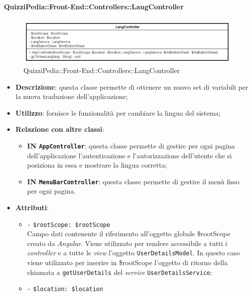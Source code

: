 \paragraph{QuizziPedia::Front-End::Controllers::LangController}
\begin{figure} [ht]
	\centering
	\includegraphics[scale=0.5]{UML/Classi/Front-End/QuizziPedia_Front-end_Controller_LangController.png}
	\caption{QuizziPedia::Front-End::Controllers::LangController}
\end{figure} \FloatBarrier
\begin{itemize}
	\item \textbf{Descrizione}: questa classe permette di ottenere un nuovo set di variabili per la nuova traduzione dell'applicazione;
	\item \textbf{Utilizzo}: fornisce le funzionalità per cambiare la lingua del sistema;
	\item \textbf{Relazione con altre classi}:
	\begin{itemize}
		\item \textbf{IN \texttt{AppController}}: questa classe permette di gestire per ogni pagina dell'applicazione l'autenticazione e l'autorizzazione dell'utente che si posiziona in essa e mostrare la lingua corretta;
		\item \textbf{IN \texttt{MenuBarController}}: questa classe permette di gestire il menù fisso per ogni pagina.
	\end{itemize}
	\item \textbf{Attributi}:
	\begin{itemize}
		\item \texttt{-} \texttt{\$rootScope: \$rootScope} \\
		Campo dati contenente il riferimento all'oggetto globale \$rootScope creato da \textit{Angular}. Viene utilizzato per rendere accessibile a tutti i \textit{controller} e a tutte le \textit{view} l'oggetto \texttt{UserDetailsModel}. In questo caso viene utilizzato per inserire in \$rootScope l'oggetto di ritorno della chiamata a \texttt{getUserDetails} del \textit{service} \texttt{UserDetailsService};
		\item \texttt{-} \texttt{\$location: \$location} \\

\end{itemize}
\end{itemize}
